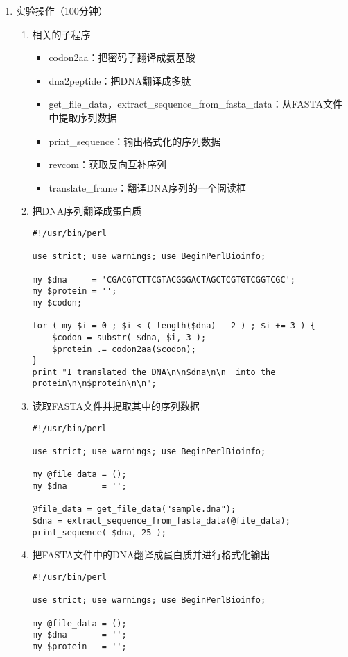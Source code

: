 \documentclass{TIJMUjiaoanSY}
\begin{document}
\firstTail

\newpage
\otherHeader

\begin{enumerate}
  \item 实验操作（100分钟）
    \begin{enumerate}
      \item 相关的子程序
	\begin{itemize}
	  \item codon2aa：把密码子翻译成氨基酸
	  \item dna2peptide：把DNA翻译成多肽
	  \item get\_file\_data，extract\_sequence\_from\_fasta\_data：从FASTA文件中提取序列数据
	  \item print\_sequence：输出格式化的序列数据
	  \item revcom：获取反向互补序列
	  \item translate\_frame：翻译DNA序列的一个阅读框
	\end{itemize}
      \item 把DNA序列翻译成蛋白质
\begin{verbatim}
#!/usr/bin/perl

use strict; use warnings; use BeginPerlBioinfo;

my $dna     = 'CGACGTCTTCGTACGGGACTAGCTCGTGTCGGTCGC';
my $protein = '';
my $codon;

for ( my $i = 0 ; $i < ( length($dna) - 2 ) ; $i += 3 ) {
    $codon = substr( $dna, $i, 3 );
    $protein .= codon2aa($codon);
}
print "I translated the DNA\n\n$dna\n\n  into the protein\n\n$protein\n\n";
\end{verbatim}
      \item 读取FASTA文件并提取其中的序列数据
\begin{verbatim}
#!/usr/bin/perl

use strict; use warnings; use BeginPerlBioinfo;

my @file_data = ();
my $dna       = '';

@file_data = get_file_data("sample.dna");
$dna = extract_sequence_from_fasta_data(@file_data);
print_sequence( $dna, 25 );
\end{verbatim}
      \item 把FASTA文件中的DNA翻译成蛋白质并进行格式化输出
\begin{verbatim}
#!/usr/bin/perl

use strict; use warnings; use BeginPerlBioinfo;

my @file_data = ();
my $dna       = '';
my $protein   = '';


\end{verbatim}
\end{enumerate}
\end{enumerate}
\end{document}
